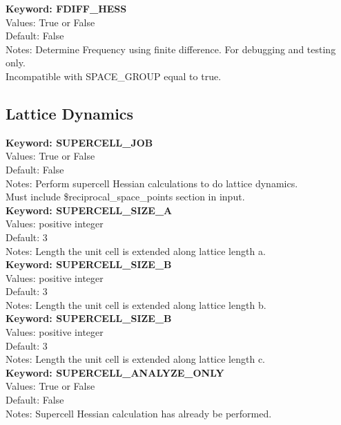 \documentclass[11pt,letterpaper]{article}
\begin{document}
\begin{spacing}{1.0}
\noindent
\textbf{Keyword: FDIFF\_HESS} \\
Values: True or False\\
Default: False\\
Notes: Determine Frequency using finite difference. For debugging and testing only.\\
Incompatible with SPACE\_GROUP equal to true.\\

\subsection{Lattice Dynamics}

\noindent
\textbf{Keyword: SUPERCELL\_JOB} \\
Values: True or False\\
Default: False\\
Notes: Perform supercell Hessian calculations to do lattice dynamics. \\
            Must include \$reciprocal\_space\_points section in input. \\

\noindent
\textbf{Keyword: SUPERCELL\_SIZE\_A} \\
Values: positive integer\\
Default: 3\\
Notes: Length the unit cell is extended along lattice length a.\\

\noindent
\textbf{Keyword: SUPERCELL\_SIZE\_B} \\
Values: positive integer\\
Default: 3\\
Notes: Length the unit cell is extended along lattice length b.\\

\noindent
\textbf{Keyword: SUPERCELL\_SIZE\_B} \\
Values: positive integer\\
Default: 3\\
Notes: Length the unit cell is extended along lattice length c.\\

\noindent
\textbf{Keyword: SUPERCELL\_ANALYZE\_ONLY} \\
Values: True or False\\
Default: False\\
Notes: Supercell Hessian calculation has already be performed. \\


\end{spacing}
\end{document}
